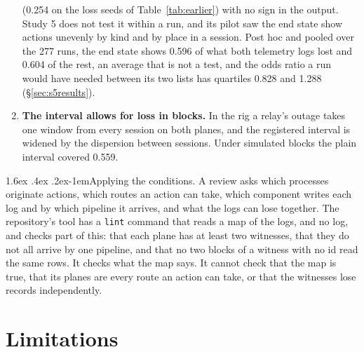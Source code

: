 \documentclass[11pt]{article}
\makeatletter
\renewcommand\paragraph{\@startsection{paragraph}{4}{\z@}%
  {1.6ex \@plus .4ex \@minus .2ex}{-1em}{\normalfont\normalsize\bfseries}}
\makeatother
\begin{document}
\begin{enumerate}
(0.254 on the loss seeds of Table~\ref{tab:earlier}) with no sign in the output. Study 5
does not test it within a run, and its pilot saw the end state show actions unevenly by
kind and by place in a session. Post hoc and pooled over the 277 runs, the end state
shows 0.596 of what both telemetry logs lost and 0.604 of the rest, an average that is
not a test, and the odds ratio a run would have needed between its two lists has
quartiles 0.828 and 1.288 (\S\ref{sec:s5results}).
\item \textbf{The interval allows for loss in blocks.} In the rig a relay's outage takes
one window from every session on both planes, and the registered interval is widened by
the dispersion between sessions. Under simulated blocks the plain interval covered 0.559.
\end{enumerate}

\paragraph{Applying the conditions.} A review asks which processes originate actions,
which routes an action can take, which component writes each log and by which pipeline
it arrives, and what the logs can lose together. The repository's tool has a
\texttt{lint} command that reads a map of the logs, and no log, and checks part of
this: that each plane has at least two witnesses, that they do not all arrive by one
pipeline, and that no two blocks of a witness with no id read the same rows. It checks
what the map says. It cannot check that the map is true, that its planes are every route an action
can take, or that the witnesses lose records independently.

\section{Limitations}
\label{sec:limits}
\end{document}
